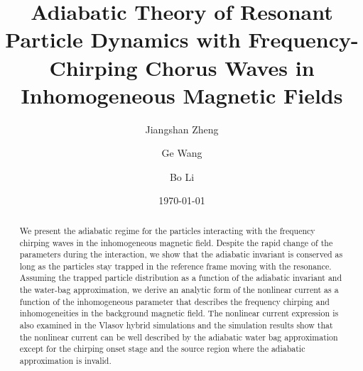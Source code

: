 \documentclass[showkeys,reprint,superscriptaddress]{revtex4-2}
\begin{document}
\title{Adiabatic Theory of Resonant Particle Dynamics with Frequency-Chirping Chorus Waves in Inhomogeneous Magnetic Fields}
\author{Jiangshan Zheng}
\author{Ge Wang}
\author{Bo Li}
\date{\today}

\begin{abstract}
 We present the adiabatic regime for the particles interacting with the frequency chirping waves in the inhomogeneous magnetic field. 
 Despite the rapid change of the parameters during the interaction, we show that the adiabatic invariant is conserved as long as the particles stay trapped in the reference frame moving with the resonance.
Assuming the trapped particle distribution as a function of the adiabatic invariant and  the water-bag approximation, we derive an analytic form of the nonlinear current
as a function of 
the inhomogeneous parameter that describes the frequency chirping and inhomogeneities in the background magnetic field.
The nonlinear current expression  is also examined in the  Vlasov hybrid simulations
and the simulation results show that  the nonlinear current can be well described by the adiabatic water bag approximation 
except for the chirping onset stage and the source region where the adiabatic approximation is invalid.
\end{abstract}
\maketitle


\end{document}
